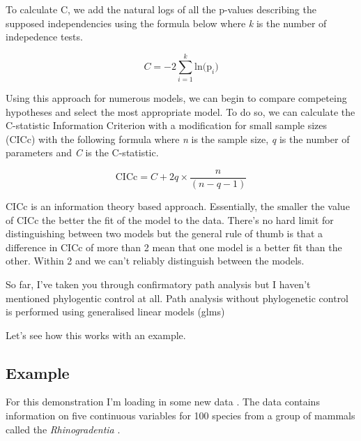 \documentclass[
]{book}
\newenvironment{Shaded}{\begin{snugshade}}{\end{snugshade}}
\newcommand{\KeywordTok}[1]{\textcolor[rgb]{0.13,0.29,0.53}{\textbf{#1}}}
\newcommand{\NormalTok}[1]{#1}
\newcommand{\OperatorTok}[1]{\textcolor[rgb]{0.81,0.36,0.00}{\textbf{#1}}}
\newcommand{\StringTok}[1]{\textcolor[rgb]{0.31,0.60,0.02}{#1}}
\begin{document}
To calculate C, we add the natural logs of all the p-values describing the supposed independencies using the formula below where \emph{k} is the number of indepedence tests.

\[ C = -2 \sum_{i=1}^k \text{ln(p}_i) \]

Using this approach for numerous models, we can begin to compare competeing hypotheses and select the most appropriate model. To do so, we can calculate the C-statistic Information Criterion with a modification for small sample sizes (CICc) with the following formula where \emph{n} is the sample size, \emph{q} is the number of parameters and \emph{C} is the C-statistic.

\[ \text{CICc} = C + 2q \times \frac{n}{(n - q - 1)}\]

CICc is an information theory based approach. Essentially, the smaller the value of CICc the better the fit of the model to the data. There's no hard limit for distinguishing between two models but the general rule of thumb is that a difference in CICc of more than 2 mean that one model is a better fit than the other. Within 2 and we can't reliably distinguish between the models.

So far, I've taken you through confirmatory path analysis but I haven't mentioned phylogentic control at all. Path analysis without phylogenetic control is performed using generalised linear models (glms)

Let's see how this works with an example.

\hypertarget{example}{%
\subsection{Example}\label{example}}

For this demonstration I'm loading in some new data \citep{Hardenberg13, Gonzalez14}. The data contains information on five continuous variables for 100 species from a group of mammals called the \emph{Rhinogradentia} \citep{snouters}.

\begin{Shaded}
\end{Shaded}
\end{document}
